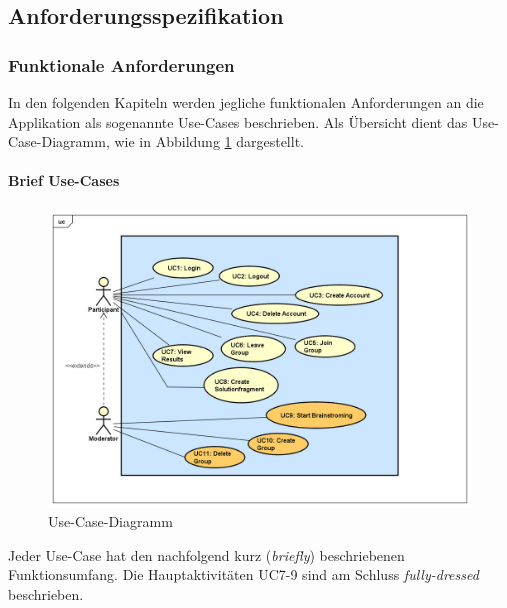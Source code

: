 \subsection{Anforderungsspezifikation}

\subsubsection{Funktionale Anforderungen}
In den folgenden Kapiteln werden jegliche funktionalen Anforderungen an die Applikation als sogenannte Use-Cases beschrieben. Als Übersicht dient das Use-Case-Diagramm, wie in Abbildung \ref{fig:ucmethode-635} dargestellt.

\paragraph{Brief Use-Cases}


\begin{figure}[h]
	\centering
	\includegraphics[width=1\linewidth]{img/anforderungen/UC-Methode635}
	\caption{Use-Case-Diagramm}
	\label{fig:ucmethode-635}
\end{figure}

Jeder Use-Case hat den nachfolgend kurz (\textit{briefly}) beschriebenen  Funktionsumfang. Die Hauptaktivitäten UC7-9 sind am Schluss \textit{fully-dressed} beschrieben.

